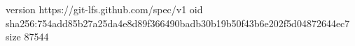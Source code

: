 version https://git-lfs.github.com/spec/v1
oid sha256:754add85b27a25da4e8d89f366490badb30b19b50f43b6e202f5d04872644ec7
size 87544

